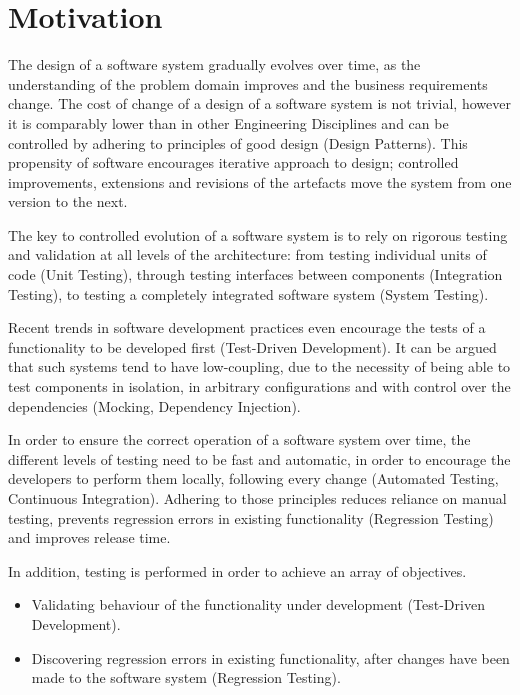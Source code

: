 \section{Motivation}


The design of a software system gradually evolves over time, as the understanding of the problem domain improves and the business requirements change. The cost of change of a design of a software system  is not trivial, however it is comparably lower than in other Engineering Disciplines and can be controlled by adhering to principles of good design (Design Patterns). This propensity of software encourages iterative approach to design; controlled improvements, extensions and revisions of the artefacts move the system from one version to the next. 

The key to controlled evolution of a software system is to rely on rigorous testing and validation at all levels of the architecture: from testing individual units of code (Unit Testing), through testing interfaces between components (Integration Testing), to testing a completely integrated software system (System Testing). 

Recent trends in software development practices even encourage the tests of a functionality to be developed first (Test-Driven Development). It can be argued that such systems tend to have low-coupling, due to the necessity of being able to test components in isolation, in arbitrary configurations and with control over the dependencies (Mocking, Dependency Injection).

In order to ensure the correct operation of a software system over time, the different levels of testing need to be fast and automatic, in order to encourage the developers to perform them locally, following every change (Automated Testing, Continuous Integration). Adhering to those principles reduces reliance on manual testing, prevents regression errors in existing functionality (Regression Testing) and improves release time.



\pagebreak
In addition, testing is performed in order to achieve an array of objectives.
\begin{itemize}
\item Validating behaviour of the functionality under development (Test-Driven Development). 
\item Discovering regression errors in existing functionality, after changes have been made to the software system (Regression Testing).
\end{itemize}

